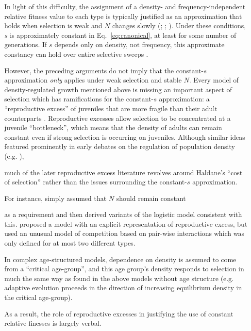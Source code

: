 \documentclass[12pt]{article}
\begin{document}
In light of this difficulty, the assignment of a density- and frequency-independent relative fitness value to each type is typically justified as an approximation that holds when selection is weak and $N$ changes slowly (\citealt{kimura1969natural}; \citealt[pp. 277]{ewens_2004}; \citealt[Chap. 4]{charlesworth_1994}). Under these conditions, $s$ is approximately constant in Eq.~\eqref{eq:canonical}, at least for some number of generations. If $s$ depends only on density, not frequency, this approximate constancy can hold over entire selective sweeps \citep[Fig. 9.5]{otto_2011}. 

However, the preceding arguments do not imply that the constant-$s$ approximation \textit{only} applies under weak selection and stable $N$. Every model of density-regulated growth mentioned above is missing an important aspect of selection which has ramifications for the constant-$s$ approximation: a ``reproductive excess'' of juveniles that are more fragile than their adult counterparts \citep{turner1968population}. Reproductive excesses allow selection to be concentrated at a juvenile ``bottleneck'', which means that the density of adults can remain constant even if strong selection is occurring on juveniles. Although similar ideas featured prominently in early debates on the regulation of population density (e.g. \citealt{nicholson_1954}), 

much of the later reproductive excess literature revolves around Haldane's ``cost of selection'' \citep{haldane_1957} rather than the issues surrounding the constant-$s$ approximation. 

For instance, \cite{kimura1969natural} simply assumed that $N$ should remain constant 

as a requirement and then derived variants of the logistic model consistent with this. \cite{nei1971fertility} proposed a model with an explicit representation of reproductive excess, but used an unusual model of competition based on pair-wise interactions which was only defined for at most two different types.

In complex age-structured models, dependence on density is assumed to come from a ``critical age-group'', and this age group's density responds to selection in much the same way as found in the above models without age structure \citep[Chap. 4]{charlesworth_1994} (e.g. adaptive evolution proceeds in the direction of increasing equilibrium density in the critical age-group). 



  As a result, the role of reproductive excesses in justifying the use of constant relative finesses is largely verbal.
\end{document}

